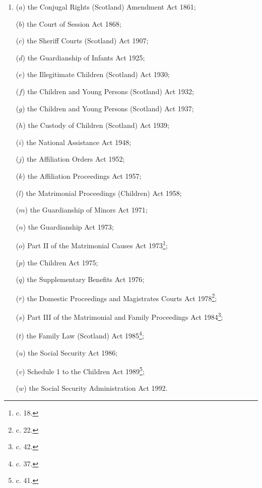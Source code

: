 \documentclass[12pt,a4paper]{article}
\begin{document}
\begin{enumerate}\item[]
($a$) the Conjugal Rights (Scotland) Amendment Act 1861;

($b$) the Court of Session Act 1868;

($c$) the Sheriff Courts (Scotland) Act 1907;

($d$) the Guardianship of Infants Act 1925;

($e$) the Illegitimate Children (Scotland) Act 1930;

($f$) the Children and Young Persons (Scotland) Act 1932;

($g$) the Children and Young Persons (Scotland) Act 1937;

($h$) the Custody of Children (Scotland) Act 1939;

($i$) the National Assistance Act 1948;

($j$) the Affiliation Orders Act 1952;

($k$) the Affiliation Proceedings Act 1957;

($l$) the Matrimonial Proceedings (Children) Act 1958;

($m$) the Guardianship of Minors Act 1971;

($n$) the Guardianship Act 1973;

($o$) Part II of the Matrimonial Causes Act 1973\footnote{ c. 18.};

($p$) the Children Act 1975;

($q$) the Supplementary Benefits Act 1976;

\begin{sloppypar}
($r$) the Domestic Proceedings and Magistrates Courts Act 1978\footnote{ c. 22.};
\end{sloppypar}

($s$) Part III of the Matrimonial and Family Proceedings Act 1984\footnote{ c. 42.};

($t$) the Family Law (Scotland) Act 1985\footnote{ c. 37.};

($u$) the Social Security Act 1986;

($v$) Schedule 1 to the Children Act 1989\footnote{ c. 41.};

($w$) the Social Security Administration Act 1992.
\end{enumerate}
\end{document}
